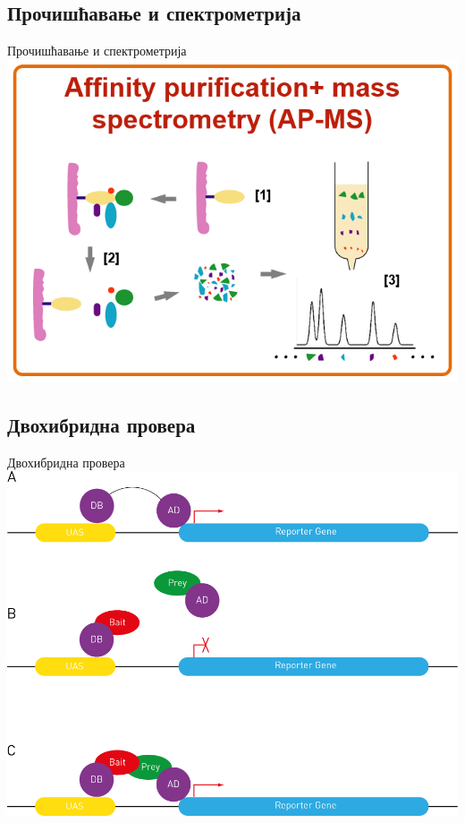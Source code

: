 \documentclass[hyperref={bookmarks=false}]{beamer}
\begin{document}
\subsection{Прочишћавање и спектрометрија}
\begin{frame}{Прочишћавање и спектрометрија}
\centering\includegraphics[width=.85\textwidth]{AP-MS.png}
\end{frame}

\subsection{Двохибридна провера}
\begin{frame}{Двохибридна провера}
\centering\includegraphics[width=.75\textwidth]{Y2H.png}
\end{frame}
\end{document}
